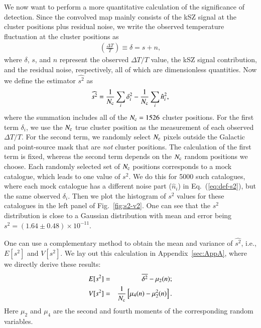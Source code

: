 \documentclass[traditabstract, longauth]{aa}
\newcommand{\1}{\'\i }
\begin{document}
We now want to perform a more quantitative calculation of the significance of
detection. Since the convolved map mainly consists of the kSZ signal at the
cluster positions plus residual noise, we write the observed temperature
fluctuation at the cluster positions as
\begin{eqnarray}
\left(\frac{\Delta T}{T} \right)\equiv \delta =s + n,\label{eq:ysn}
\end{eqnarray}
where $\delta$, $s$, and $n$ represent the observed $\Delta T/T$ value, the
kSZ signal contribution, and the residual noise, respectively,
all of which are dimensionless
quantities. Now we define the estimator $\widehat{s^{2}}$ as
\begin{eqnarray}
\widehat{s^{2}}=\frac{1}{N_{\rm c}}\sum_{i} \delta_{i}^{2} -\frac{1}{N_{\rm c}} \sum_{i} \hat{n}^{2}_{i} , \label{eq:def-s2}
\end{eqnarray}
where the summation includes all of the $N_{\rm c}=1526$ cluster
positions. For the first term $\delta_{i}$, we use the $N_{\rm c}$ true cluster position as the measurement of each observed $\Delta T/T$. For the second term, we randomly select $N_{\rm c}$ pixels outside the Galactic and point-source mask that are {\it not} cluster positions. The calculation of the first term is fixed, whereas the second term depends on the $N_{\rm c}$ random positions we choose. Each randomly selected set of $N_{\rm c}$ positions corresponds to a mock catalogue, which leads to one value of $s^{2}$. We do this for 5000 such catalogues, where each mock catalogue has a different noise part ($\hat{n}_{i}$) in Eq.~(\ref{eq:def-s2}), but the same observed $\delta_{i}$. Then we plot the histogram of $s^{2}$ values for these catalogues in the left panel of Fig.~\ref{fig:s2-v2}. One can see that the $s^{2}$ distribution is close to a Gaussian distribution with mean and error being $s^{2}=(1.64 \pm 0.48) \times 10^{-11}$.

One can use a complementary method to obtain the mean and variance of $\widehat{s^{2}}$, i.e., $E[s^{2}]$ and $V[s^{2}]$. We lay out this calculation
in Appendix~\ref{sec:AppA}, where we directly derive these results:
\begin{eqnarray}
E[s^{2}] &=& \overline{\delta^{2}}-\mu_{2}(n); \nonumber \\
V[s^{2}] &=& \frac{1}{N_{\rm c}}\left[\mu_{4}(n)-\mu^{2}_{2}(n)\right].
 \label{eq:Es2-Vs2}
\end{eqnarray}
Here $\mu_{2}$ and $\mu_{4}$ are the second and fourth moments of the
corresponding random variables.
\end{document}

